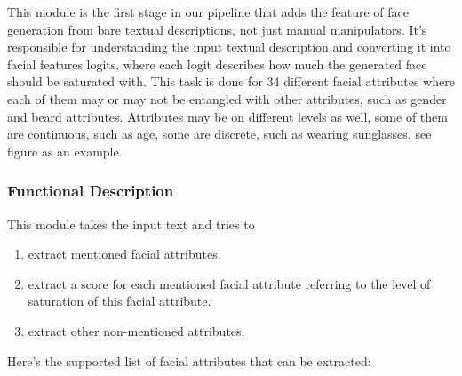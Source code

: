 This module is the first stage in our pipeline that adds the feature of face generation from bare textual descriptions, not just manual manipulators. It's responsible for understanding the input textual description and converting it into facial features logits, where each logit describes how much the generated face should be saturated with. This task is done for 34 different facial attributes where each of them may or may not be entangled with other attributes, such as gender and beard attributes. Attributes may be on different levels as well, some of them are continuous, such as age, some are discrete, such as wearing sunglasses. see figure  as an example. 


\subsubsection{Functional Description}
This module takes the input text and tries to 
\begin{enumerate}
    \item extract mentioned facial attributes.
    \item extract a score for each mentioned facial attribute referring to the level of saturation of this facial attribute.
    \item extract other non-mentioned attributes.
\end{enumerate}

Here’s the supported list of facial attributes that can be extracted:

